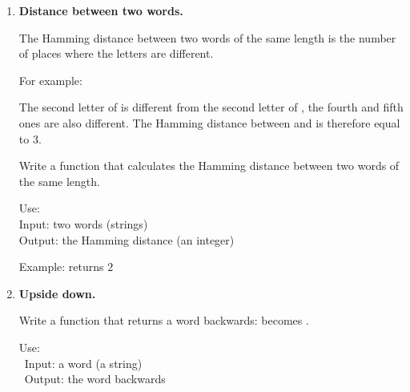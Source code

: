 \documentclass[11pt,class=report,crop=false]{standalone}
\begin{document}

\begin{activite}


  
  
\begin{enumerate}
  \item \textbf{Distance between two words.}
  
  The Hamming distance between two words of the same length is the number of places where the letters are different.

For example: 


The second letter of  is different from the second letter of , the fourth and fifth ones are also different. The Hamming distance between  and  is therefore equal to $3$.  

Write a function  that calculates the Hamming distance between two words of the same length.

  \begin{fonction}
  Use:  \\
  Input: two words (strings) \\
  Output: the Hamming distance (an integer)
  
  \medskip
    
  Example:  returns $2$
  \end{fonction}

      

  
  \item \textbf{Upside down.} 
  
  Write a function  that returns a word backwards:  becomes .
  
  \medskip
  
  \begin{fonction}[\ci{upsidedown()}]
  Use:  \\\
  Input: a word (a string) \\\
  Output: the word backwards
  

\end{fonction}
\end{enumerate}
\end{activite}
\end{document}
